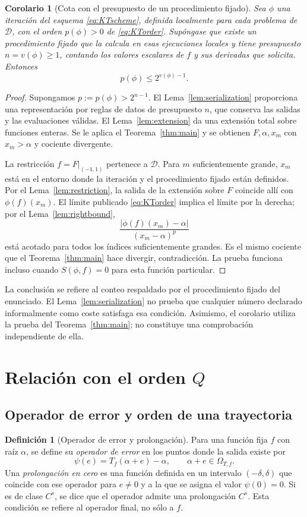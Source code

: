 \documentclass[11pt,a4paper]{article}
\numberwithin{equation}{section}
\newtheorem{corollary}[theorem]{Corolario}
\theoremstyle{definition}
\newtheorem{definition}[theorem]{Definición}
\theoremstyle{remark}
\newcommand{\DD}{\mathcal D}
\begin{document}
\begin{corollary}[Cota con el presupuesto de un procedimiento fijado]\label{cor:KT}
Sea $\phi$ una iteración del esquema \eqref{eq:KTscheme}, definida localmente para cada problema de $\DD$, con el orden $p(\phi)>0$ de \eqref{eq:KTorder}. Supóngase que existe un procedimiento fijado que la calcula en esas ejecuciones locales y tiene presupuesto $n=v(\phi)\ge1$, contando los valores escalares de $f$ y sus derivadas que solicita. Entonces
\[
p(\phi)\le2^{v(\phi)-1}.
\]
\end{corollary}
\begin{proof}
Supongamos $p:=p(\phi)>2^{n-1}$. El Lema~\ref{lem:serialization} proporciona una representación por reglas de datos de presupuesto $n$, que conserva las salidas y las evaluaciones válidas. El Lema~\ref{lem:extension} da una extensión total sobre funciones enteras. Se le aplica el Teorema~\ref{thm:main} y se obtienen $F,\alpha,x_m$ con $x_m>\alpha$ y cociente divergente.

La restricción $f=F|_{(-1,1)}$ pertenece a $\DD$. Para $m$ suficientemente grande, $x_m$ está en el entorno donde la iteración y el procedimiento fijado están definidos. Por el Lema~\ref{lem:restriction}, la salida de la extensión sobre $F$ coincide allí con $\phi(f)(x_m)$. El límite publicado \eqref{eq:KTorder} implica el límite por la derecha; por el Lema~\ref{lem:rightbound},
\[
\frac{|\phi(f)(x_m)-\alpha|}{(x_m-\alpha)^p}
\]
está acotado para todos los índices suficientemente grandes. Es el mismo cociente que el Teorema~\ref{thm:main} hace divergir, contradicción. La prueba funciona incluso cuando $S(\phi,f)=0$ para esta función particular.
\end{proof}

La conclusión se refiere al conteo respaldado por el procedimiento fijado del enunciado. El Lema~\ref{lem:serialization} no prueba que cualquier número declarado informalmente como coste satisfaga esa condición. Asimismo, el corolario utiliza la prueba del Teorema~\ref{thm:main}; no constituye una comprobación independiente de ella.

\clearpage
\section{Relación con el orden \texorpdfstring{$Q$}{Q}}\label{sec:Q}

\subsection{Operador de error y orden de una trayectoria}
\begin{definition}[Operador de error y prolongación]\label{def:errorop}
Para una función fija $f$ con raíz $\alpha$, se define su \emph{operador de error} en los puntos donde la salida existe por
\[
\psi(e)=T_f(\alpha+e)-\alpha,\qquad
\alpha+e\in\Omega_{T,f}.
\]
Una \emph{prolongación en cero} es una función definida en un intervalo $(-\delta,\delta)$ que coincide con ese operador para $e\ne0$ y a la que se asigna el valor $\psi(0)=0$. Si es de clase $C^s$, se dice que el operador admite una prolongación $C^s$. Esta condición se refiere al operador final, no sólo a $f$.
\end{definition}
\end{document}
